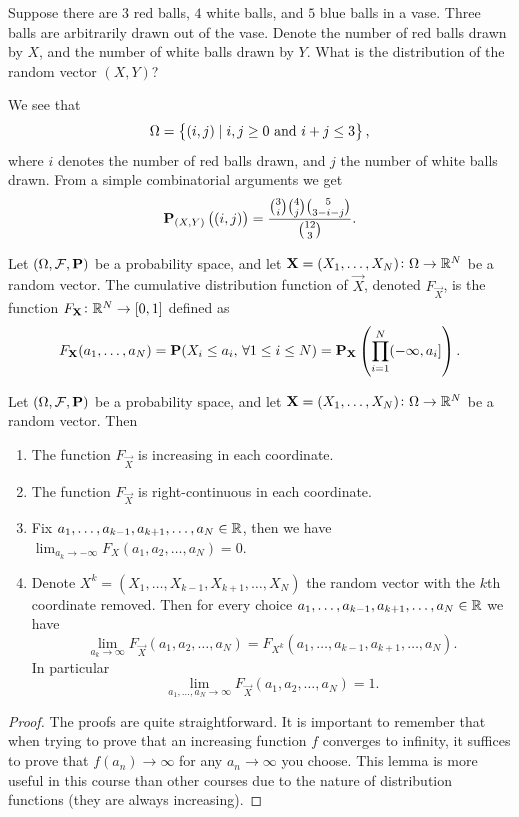\documentclass[11pt,a4paper]{article}
\begin{document}
\begin{exercise}
  Suppose there are
  $3$ red balls, $4$ white balls, and $5$ blue balls in a vase.
  Three balls are arbitrarily drawn out of the vase.
  Denote the number of red balls drawn by $X$, and the number of white
  balls drawn by $Y$.
  What is the distribution of the random vector $(X,Y)$?
\end{exercise}
\begin{solution}
  We see that
  \[
    \Omega = \left\{(i,j) \mid i,j \geq 0 \text{ and } i + j \le 3\right\},
  \]
  where $i$ denotes the number of red balls drawn, and $j$ the number
  of white balls drawn.
  From a simple combinatorial arguments we get
  \[
    \mathbf{P}_{(X,Y)}\left((i,j)\right) =
    \frac{\binom{3}{i}\binom{4}{j}\binom{5}{3-i-j}}{\binom{12}{3}}.
  \]
\end{solution}

\begin{definition}
  Let $(\Omega, \mathcal F, \mathbf{P})$ be a probability space, 
  and let $\boldsymbol{\mathbf{X}} = (X_1,\dots,X_N) \colon \Omega \to \mathbb{R}^N$ be a random vector.
  The cumulative distribution function of $\vec{X}$, denoted $F_{\vec{X}}$, 
  is the function $F_{\boldsymbol{\mathbf{X}}} \colon \mathbb{R}^N \to [0,1]$ defined as
  \[
    F_{\boldsymbol{\mathbf{X}}}(a_1,\dots,a_N) =
    \mathbf{P}(X_i \le a_i,\, \forall 1 \le i \le N) =
    \mathbf{P}_{\boldsymbol{\mathbf{X}}}\left(\prod_{i=1}^{N}(-\infty,a_i]\right).
  \]
\end{definition}

\begin{proposition}
  \label{prop:rv-properties-of-cdf}
  Let $(\Omega, \mathcal F, \mathbf{P})$ be a probability space, 
  and let $\boldsymbol{\mathbf{X}} = (X_1,\dots,X_N) \colon \Omega \to \mathbb{R}^N$ be a random vector.
  Then
  \begin{enumerate}
    \item[(1)] The function $F_{\vec{X}}$ is increasing in each coordinate.
    \item[(2)] The function $F_{\vec{X}}$ is right-continuous in each 
      coordinate.
    \item[(3)] Fix $a_1,\dots,a_{k-1},a_{k+1},\dots,a_N \in \mathbb{R}$, then
      we have $\lim_{a_k \to -\infty}{F_X(a_1,a_2,\dots,a_N)} = 0$.
    \item[(4)] Denote $X^k = (X_1,\dots,X_{k-1},X_{k+1},\dots,X_N)$ the random 
    vector with the $k$th coordinate removed. 
    Then for every choice $a_1,\dots,a_{k-1},a_{k+1},\dots,a_N \in \mathbb{R}$
    we have
    \[
      \lim_{a_k \to \infty} F_{\vec{X}}(a_1,a_2,\dots,a_N) =
      F_{X^k}(a_1,\dots,a_{k-1},a_{k+1},\dots,a_N).
    \]
    In particular
    \[
      \lim_{a_1,\dots,a_N \to \infty} F_{\vec{X}}(a_1,a_2,\dots,a_N) = 1.
    \]
  \end{enumerate}
\end{proposition}
\begin{proof}
  The proofs are quite straightforward.
  It is important to remember that when trying to prove
  that an increasing function $f$ converges to infinity, it suffices
  to prove that $f(a_n) \to \infty$ for any $a_n \to \infty$ you choose.
  This lemma is more useful in this course than other courses due
  to the nature of distribution functions (they are always increasing).
\end{proof}
\end{document}
